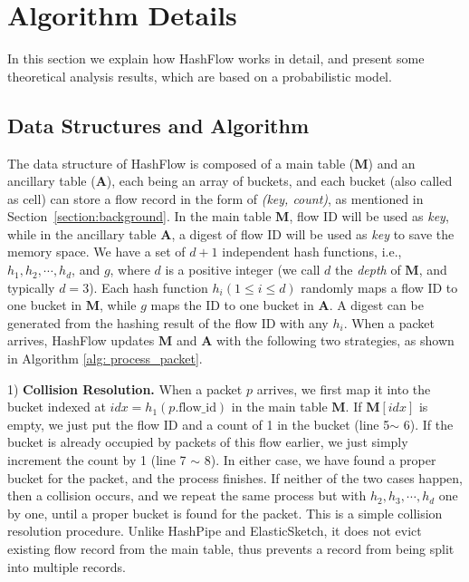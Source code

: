\section{Algorithm Details}
\label{section:algorithmoverview}
In this section we explain how HashFlow works in detail, and present some theoretical analysis results, 
which are based on a probabilistic model.

\subsection{Data Structures and Algorithm}
The data structure of HashFlow is composed of a main table (${\mathbf M}$) and an ancillary table (${\mathbf A}$), 
each being an array of buckets, and each bucket (also called as cell) can store a flow record
in the form of \emph{(key, count)}, as mentioned in Section~\ref{section:background}. 
In the main table ${\mathbf M}$, flow ID will be used as \emph{key}, 
while in the ancillary table ${\mathbf A}$, a digest of flow ID will be used as \emph{key} to save the memory space.
We have a set of $d+1$ independent hash functions, i.e., $h_1, h_2, \cdots, h_d$, and $g$, 
where $d$ is a positive integer (we  call $d$ the  \emph{depth} of ${\mathbf M}$, and typically $d=3$). 
Each hash function $h_{i} (1 \le i \le d)$  randomly maps a flow ID to one bucket in ${\mathbf M}$, 
while $g$ maps the ID to one bucket in ${\mathbf A}$. 
A digest can be generated from the hashing result of the flow ID with any $h_i$.
When a packet arrives, HashFlow updates ${\mathbf M}$ and ${\mathbf A}$ with the following 
two strategies, as shown in Algorithm \ref{alg: process_packet}.

1) \textbf{Collision Resolution.} When a packet $p$ arrives, we first map it into the bucket indexed 
at $idx=h_1(p.\text{flow\_id})$ in the main table ${\mathbf M}$.  
If ${\mathbf M}[idx]$ is empty, we just put the flow ID and a count of 1 in the bucket (line 5$\sim$ 6).
If the bucket is already occupied by packets of this flow earlier, 
we just simply increment the count by 1 (line 7 $\sim$ 8). 
In either case, we have found a proper bucket for the packet, and the process finishes. 
If neither of the two cases happen, then a collision occurs, 
and we repeat the same process but with $h_2, h_3, \cdots, h_d$ one by one, 
until a proper bucket is found for the packet. 
This is a simple collision resolution procedure. 
Unlike HashPipe and ElasticSketch, it does not evict existing flow record from the main table, 
thus prevents a record from being split into multiple records. 

